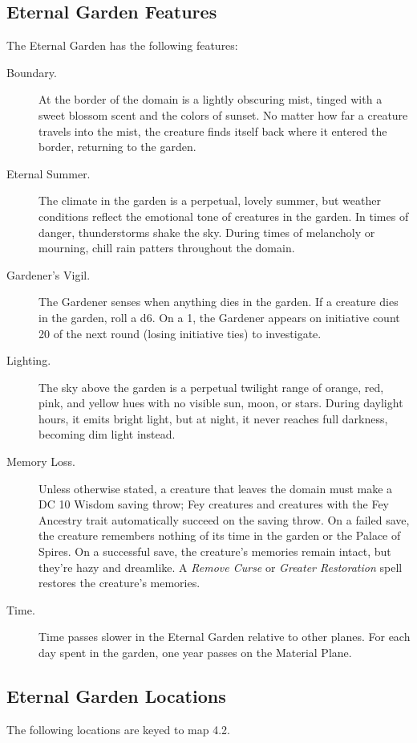 \documentclass[10pt,a4paper,twoside,bg=print,twocolumn,openany,nodeprecatedcode]{dndbook}
\begin{document}
\subsection{Eternal Garden Features}
The Eternal Garden has the following features:


\begin{description}
\item[Boundary.]
At the border of the domain is a lightly obscuring mist, tinged with a sweet blossom scent and the colors of sunset. No matter how far a creature travels into the mist, the creature finds itself back where it entered the border, returning to the garden.
\item[Eternal Summer.]
The climate in the garden is a perpetual, lovely summer, but weather conditions reflect the emotional tone of creatures in the garden. In times of danger, thunderstorms shake the sky. During times of melancholy or mourning, chill rain patters throughout the domain.
\item[Gardener's Vigil.]
The Gardener senses when anything dies in the garden. If a creature dies in the garden, roll a d6. On a 1, the Gardener appears on initiative count 20 of the next round (losing initiative ties) to investigate.
\item[Lighting.]
The sky above the garden is a perpetual twilight range of orange, red, pink, and yellow hues with no visible sun, moon, or stars. During daylight hours, it emits bright light, but at night, it never reaches full darkness, becoming dim light instead.
\item[Memory Loss.]
Unless otherwise stated, a creature that leaves the domain must make a DC 10 Wisdom saving throw; Fey creatures and creatures with the Fey Ancestry trait automatically succeed on the saving throw. On a failed save, the creature remembers nothing of its time in the garden or the Palace of Spires. On a successful save, the creature's memories remain intact, but they're hazy and dreamlike. A \textit{Remove Curse} or \textit{Greater Restoration} spell restores the creature's memories.
\item[Time.]
Time passes slower in the Eternal Garden relative to other planes. For each day spent in the garden, one year passes on the Material Plane.
\end{description}

\subsection{Eternal Garden Locations}
The following locations are keyed to map 4.2.
\end{document}
